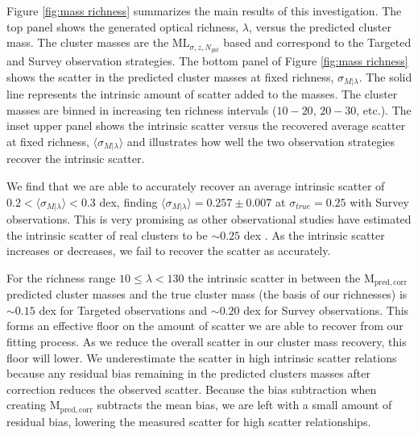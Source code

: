 Figure \ref{fig:mass richness} summarizes the main results of this investigation. The top panel shows the generated optical richness, $\lambda$, versus the predicted cluster mass. The cluster masses are the $\mathrm{ML}_{\sigma, z, N_{gal}}$ based and correspond to the Targeted and Survey observation strategies. The bottom panel of Figure \ref{fig:mass richness} shows the scatter in the predicted cluster masses at fixed richness, $\sigma_{M|\lambda}$. The solid line represents the intrinsic amount of scatter added to the masses. The cluster masses are binned in increasing ten richness intervals ($10-20$, $20-30$, etc.). The inset upper panel shows the intrinsic scatter versus the recovered average scatter at fixed richness, $\langle \sigma_{M|\lambda} \rangle$ and illustrates how well the two observation strategies recover the intrinsic scatter. 

We find that we are able to accurately recover an average intrinsic scatter of $0.2 <\langle \sigma_{M|\lambda} \rangle <0.3$ dex, finding $\langle \sigma_{M|\lambda} \rangle = 0.257\pm0.007$ at $\sigma_{true} = 0.25$ with Survey observations. This is very promising as other observational studies have estimated the intrinsic scatter of real clusters to be $\sim0.25$ dex . As the intrinsic scatter increases or decreases, we fail to recover the scatter as accurately.

For the richness range $10 \leq \lambda < 130$ the intrinsic scatter in between the $\mathrm{M_{pred,corr}}$ predicted cluster masses and the true cluster mass (the basis of our richnesses) is $\sim0.15$ dex for Targeted observations and $\sim0.20$ dex for Survey observations. This forms an effective floor on the amount of scatter we are able to recover from our fitting process. As we reduce the overall scatter in our cluster mass recovery, this floor will lower. We underestimate the scatter in high intrinsic scatter relations because any residual bias remaining in the predicted clusters masses after correction reduces the observed scatter. Because the bias subtraction when creating $\mathrm{M_{pred,corr}}$ subtracts the mean bias, we are left with a small amount of residual bias, lowering the measured scatter for high scatter relationships.

